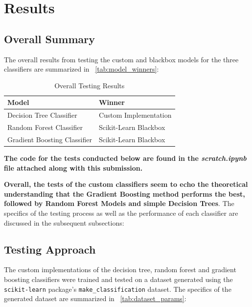\graphicspath{{images/}}

\section{Results}

\subsection{Overall Summary}

The overall results from testing the custom and blackbox models for the three classifiers are summarized in ~\autoref{tab:model_winners}:

\begin{table}[H]
  \centering
  \caption{Overall Testing Results}
  \label{tab:model_winners}
  \begin{tabularx}{0.85\textwidth}{X|X}
    \toprule
    \textbf{Model}               & \textbf{Winner}       \\
    \midrule
    Decision Tree Classifier     & Custom Implementation \\
    Random Forest Classifier     & Scikit-Learn Blackbox \\
    Gradient Boosting Classifier & Scikit-Learn Blackbox \\
    \bottomrule
  \end{tabularx}
\end{table}
\FloatBarrier

\textbf{The code for the tests conducted below are found in the \textit{scratch.ipynb} file attached along with this submission.}

\textbf{Overall, the tests of the custom classifiers seem to echo the theoretical understanding that the Gradient Boosting method performs the best, followed by Random Forest Models and simple Decision Trees}. The specifics of the testing process as well as the performance of each classifier are discussed in the subsequent subsections:

\subsection{Testing Approach}

The custom implementations of the decision tree, random forest and gradient boosting classifiers were trained and tested on a dataset generated using the \texttt{scikit-learn} package's \texttt{make\_classification} dataset. The specifics of the generated dataset are summarized in ~\autoref{tab:dataset_params}:

